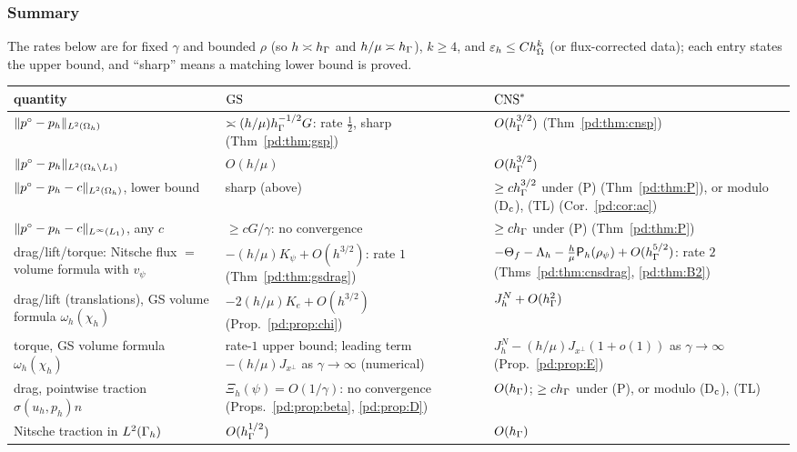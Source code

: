 \subsubsection{Summary}
The rates below are for fixed $\gamma$ and bounded $\rho$ (so $h\asymp h_\Gamma$ and $h/\mu\asymp h_\Gamma$), $k\ge4$, and $\varepsilon_h\le Ch_\Omega^k$ (or flux-corrected data); each entry states the upper bound, and ``sharp'' means a matching lower bound is proved.
\begin{center}\footnotesize
\begin{tabular}{>{\raggedright\arraybackslash}p{}>{\raggedright\arraybackslash}p{}>{\raggedright\arraybackslash}p{}}
\toprule
quantity & $\mathrm{GS}$ & $\mathrm{CNS}^\ast$\\
\midrule
$\lVert p^\circ-p_h\rVert_{L^2(\Omega_h)}$ & $\asymp(h/\mu)h_\Gamma^{-1/2}G$: rate $\frac12$, sharp (Thm~\ref{pd:thm:gsp}) & $O(h_\Gamma^{3/2})$ (Thm~\ref{pd:thm:cnsp})\\
$\lVert p^\circ-p_h\rVert_{L^2(\Omega_h\setminus L_1)}$ & $O(h/\mu)$ & $O(h_\Gamma^{3/2})$\\
$\lVert p^\circ-p_h-c\rVert_{L^2(\Omega_h)}$, lower bound & sharp (above) & $\ge ch_\Gamma^{3/2}$ under (P) (Thm~\ref{pd:thm:P}), or modulo (D$_{\rm c}$), (TL) (Cor.~\ref{pd:cor:ac})\\
$\lVert p^\circ-p_h-c\rVert_{L^\infty(L_1)}$, any $c$ & $\ge cG/\gamma$: no convergence & $\ge ch_\Gamma$ under (P) (Thm~\ref{pd:thm:P})\\
drag/lift/torque: Nitsche flux $=$ volume formula with $v_\psi$ & $-(h/\mu)K_\psi+O(h^{3/2})$: rate $1$ (Thm~\ref{pd:thm:gsdrag}) & $-\Theta_f-\Lambda_h-\frac h\mu\mathsf P_h(\rho_\psi)+O(h_\Gamma^{5/2})$: rate $2$ (Thms~\ref{pd:thm:cnsdrag}, \ref{pd:thm:B2})\\
drag/lift (translations), GS volume formula $\omega_h(\chi_h)$ & $-2(h/\mu)K_e+O(h^{3/2})$ (Prop.~\ref{pd:prop:chi}) & $J^N_h+O(h_\Gamma^2)$\\
torque, GS volume formula $\omega_h(\chi_h)$ & rate-$1$ upper bound; leading term $-(h/\mu)J_{x^\perp}$ as $\gamma\to\infty$ (numerical) & $J^N_h-(h/\mu)J_{x^\perp}(1+o(1))$ as $\gamma\to\infty$ (Prop.~\ref{pd:prop:E})\\
drag, pointwise traction $\sigma(u_h,p_h)n$ & $\Xi_h(\psi)=O(1/\gamma)$: no convergence (Props.~\ref{pd:prop:beta}, \ref{pd:prop:D}) & $O(h_\Gamma)$; $\ge ch_\Gamma$ under (P), or modulo (D$_{\rm c}$), (TL)\\
Nitsche traction in $L^2(\Gamma_h)$ & $O(h_\Gamma^{1/2})$ & $O(h_\Gamma)$\\
\bottomrule
\end{tabular}
\end{center}

